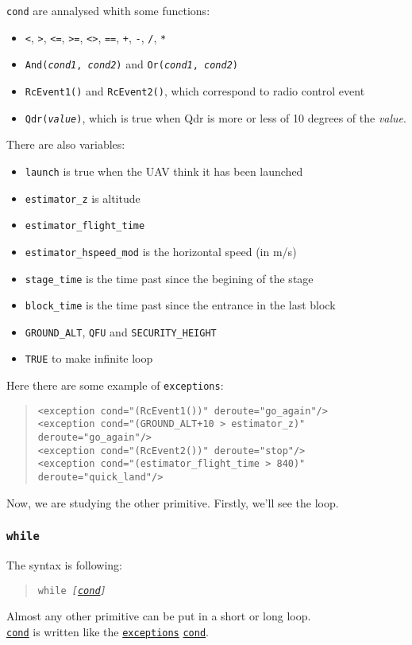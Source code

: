 \documentclass{article}
\renewcommand{\tt}[1]{\texttt{#1}}
\newcommand{\ex}[1]{\colorbox[gray]{0.92}{\tt{#1}}}
\newcommand{\qt}[1]{\textcolor{gris75}{#1}}
\begin{document}
\tt{\hypertarget{cond}{cond}} are annalysed whith some functions:

\begin{itemize}
	\item \tt{<}, \tt{>}, \tt{<=}, \tt{>=}, \tt{<>}, \tt{==}, \tt{+}, \tt{-}, \tt{/}, \tt{*}
	\item \tt{And(\emph{cond1}, \emph{cond2})} and \tt{Or(\emph{cond1}, \emph{cond2})}
	\item \tt{RcEvent1()} and \tt{RcEvent2()}, which correspond
	to radio control event
	\item \tt{Qdr(\emph{value})}, which is true when Qdr is more or less
	of 10 degrees of the \emph{value}.
\end{itemize}

There are also variables:
\begin{itemize}
	\item \tt{launch} is true when the UAV think it has been launched
	\item \tt{estimator\_z} is altitude
	\item \tt{estimator\_flight\_time}
	\item \tt{estimator\_hspeed\_mod} is the horizontal speed (in m/s)
	\item \tt{stage\_time} is the time past since the begining of the stage
	\item \tt{block\_time} is the time past since the entrance in the
	last block
	\item \tt{GROUND\_ALT}, \tt{QFU} and \tt{SECURITY\_HEIGHT}
	\item \tt{TRUE} to make infinite loop \\
\end{itemize}


Here there are some example of \tt{exceptions}:
\begin{quote}
	\ex{<exception cond="\qt{(RcEvent1())}" deroute="\qt{go\_again}"/>} \\
	\ex{<exception cond="\qt{(GROUND\_ALT+10 > estimator\_z)}" deroute="\qt{go\_again}"/>} \\
	\ex{<exception cond="\qt{(RcEvent2())}" deroute="\qt{stop}"/>} \\
	\ex{<exception cond="\qt{(estimator\_flight\_time > 840)}" deroute="\qt{quick\_land}"/>}
\end{quote}

Now, we are studying the other primitive. Firstly, we'll see the loop.


\hypertarget{while}{\subsubsection{\tt{while}}}
The syntax is following:
\begin{quote}
	\tt{while \emph{[\hyperlink{cond}{cond}]}}
\end{quote}
Almost any other primitive can be put in a short or long loop. \\
\tt{\hyperlink{cond}{cond}} is written like the \tt{\hyperlink{exceptions}{exceptions}} \tt{\hyperlink{cond}{cond}}.
\\
\end{document}
